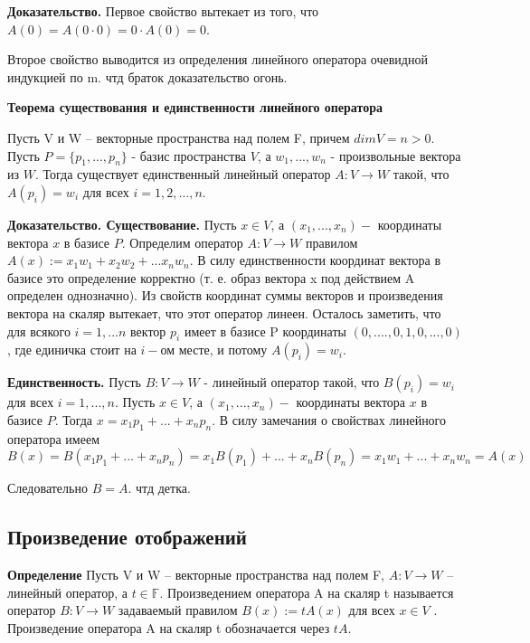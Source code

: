 \documentclass[a4paper]{article}
\begin{document}
\begin{hproof}
\textbf{Доказательство.} Первое свойство вытекает из того, что $A(0) = A(0 \cdot 0) = 0 \cdot A(0) = 0$.

Второе свойство выводится из определения линейного оператора очевидной индукцией по m. чтд браток доказательство огонь.
\end{hproof}


\begin{htheorem}
\textbf{Теорема существования и единственности линейного оператора}

Пусть V и W – векторные пространства над полем F, причем $dim V = n > 0$. Пусть $P = \{ p_1, ..., p_n \}$ - базис пространства $V$, а $w_1, ..., w_n$ - произвольные вектора из $W$.  Тогда существует
единственный линейный оператор $A: V \rightarrow W$ такой, что $A(p_i) = w_i$ для всех $i = 1, 2, ..., n$.
\end{htheorem}


\begin{hproof}
\textbf{Доказательство. Существование.} Пусть $x \in V$, а $(x_1, ..., x_n) - $ координаты вектора $x$ в базисе $P$. Определим оператор $A: V \rightarrow W$ правилом $A(x) := x_1w_1+x_2w_2+...x_nw_n$. В силу единственности координат вектора в базисе это определение корректно (т. е. образ вектора x под действием A определен однозначно). Из свойств координат суммы векторов и произведения вектора на скаляр вытекает, что этот оператор
линеен. Осталось заметить, что для всякого $i = 1,...n$ вектор $p_i$ имеет в базисе P координаты $(0,....,0,1,0,...,0)$, где единичка стоит на $i-$ом месте, и потому $A(p_i) = w_i$.

\textbf{Единственность.} Пусть $B: V \rightarrow W$ - линейный оператор такой, что $B(p_i) = w_i$ для всех $i = 1,...,n$. Пусть $x \in V$, а $(x_1, ..., x_n) - $ координаты вектора $x$ в базисе $P$. Тогда $x = x_1p_1 + ... + x_np_n$. В силу замечания о свойствах линейного оператора имеем
\begin{equation}
B(x) = B(x_1p_1 + ... + x_np_n) = x_1B(p_1) + ... + x_nB(p_n) = x_1w_1 + ... + x_nw_n = A(x)
\end{equation}

Следовательно $B=A$. чтд детка.
\end{hproof}



\subsection*{Произведение отображений}
\textbf{Определение} Пусть V и W – векторные пространства над полем F, $A: V \rightarrow W$ –
линейный оператор, а $t \in \mathbb{F}$. Произведением оператора A на скаляр t
называется оператор $B: V \rightarrow W$ задаваемый правилом $B(x) := tA(x)$ для
всех $x \in V$ . Произведение оператора A на скаляр t обозначается через $tA$.
\end{document}
